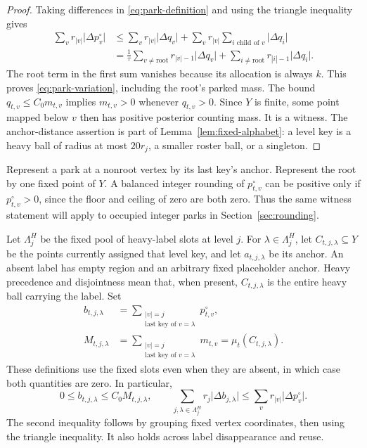 \begin{proof}
Taking differences in \eqref{eq:park-definition} and using the triangle
inequality gives
\begin{align*}
 \sum_v r_{|v|}\lvert\Delta p_v^{\circ}\rvert
 &\le \sum_v r_{|v|}\lvert\Delta q_v\rvert
     +\sum_v r_{|v|}\sum_{i\text{ child of }v}
                                  \lvert\Delta q_i\rvert\\
 &=\frac1\tau\sum_{v\ne\mathrm{root}}
                 r_{|v|-1}\lvert\Delta q_v\rvert
   +\sum_{i\ne\mathrm{root}}r_{|i|-1}\lvert\Delta q_i\rvert.
\end{align*}
The root term in the first sum vanishes because its allocation is always
$k$.  This proves \eqref{eq:park-variation}, including the root's parked
mass.  The bound $q_{t,v}\le C_0m_{t,v}$ implies $m_{t,v}>0$ whenever
$q_{t,v}>0$.  Since $Y$ is finite, some point mapped below $v$ then has
positive posterior counting mass.  It is a witness.  The anchor-distance
assertion is part of Lemma~\ref{lem:fixed-alphabet}: a level key is a
heavy ball of radius at most $20r_j$, a smaller roster ball, or a
singleton.
\end{proof}

Represent a park at a nonroot vertex by its last key's anchor.  Represent
the root by one fixed point of $Y$.  A balanced integer rounding of
$p_{t,v}^{\circ}$ can be positive only if $p_{t,v}^{\circ}>0$, since the
floor and ceiling of zero are both zero.  Thus the same witness statement
will apply to occupied integer parks in Section~\ref{sec:rounding}.

Let $\Lambda_j^H$ be the fixed pool of heavy-label slots at level $j$.
For $\lambda\in\Lambda_j^H$, let $C_{t,j,\lambda}\subseteq Y$ be the
points currently assigned that level key, and let $a_{t,j,\lambda}$ be
its anchor.  An absent label has empty region and an arbitrary fixed
placeholder anchor.  Heavy precedence and disjointness mean that, when
present, $C_{t,j,\lambda}$ is the entire heavy ball carrying the label.
Set
\begin{equation}\label{eq:label-park-size}
 \begin{aligned}
 b_{t,j,\lambda}
   &=\sum_{\substack{|v|=j\\\text{last key of }v=\lambda}}
                                              p_{t,v}^{\circ},\\
 M_{t,j,\lambda}
   &=\sum_{\substack{|v|=j\\\text{last key of }v=\lambda}}m_{t,v}
     =\mu_t(C_{t,j,\lambda}).
 \end{aligned}
\end{equation}
These definitions use the fixed slots even when they are absent, in
which case both quantities are zero.  In particular,
\begin{equation}\label{eq:label-park-domination}
 0\le b_{t,j,\lambda}\le C_0 M_{t,j,\lambda},\qquad
 \sum_{j,\lambda\in\Lambda_j^H}r_j\lvert\Delta b_{j,\lambda}\rvert
 \le\sum_v r_{|v|}\lvert\Delta p_v^{\circ}\rvert.
\end{equation}
The second inequality follows by grouping fixed vertex coordinates,
then using the triangle inequality.  It also holds across label
disappearance and reuse.

